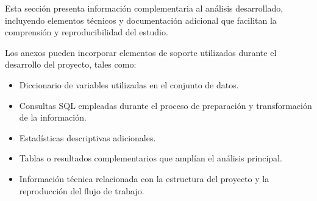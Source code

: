 

Esta sección presenta información complementaria al análisis desarrollado, incluyendo elementos técnicos y documentación adicional que facilitan la comprensión y reproducibilidad del estudio.




Los anexos pueden incorporar elementos de soporte utilizados durante el desarrollo del proyecto, tales como:


\begin{itemize}

\item Diccionario de variables utilizadas en el conjunto de datos.

\item Consultas SQL empleadas durante el proceso de preparación y transformación de la información.

\item Estadísticas descriptivas adicionales.

\item Tablas o resultados complementarios que amplían el análisis principal.

\item Información técnica relacionada con la estructura del proyecto y la reproducción del flujo de trabajo.

\end{itemize}